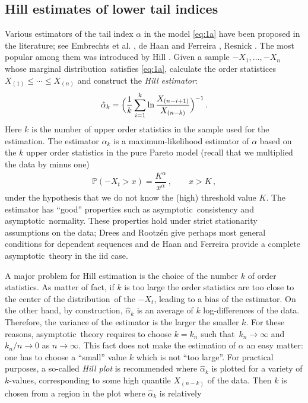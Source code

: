 \documentclass[11pt,a4]{amsart}
\newcommand{\asy}{asymptotic}
\newcommand{\beao}{\begin{eqnarray*}}
\newcommand{\eeao}{\end{eqnarray*}\noindent}
\newcommand{\beam}{\begin{eqnarray}}
\newcommand{\eeam}{\end{eqnarray}\noindent}
\newcommand{\nto}{n\to\infty}
\newcommand{\st}{such that}
\newcommand{\ds}{distribution}
\newcommand{\seq}{sequence}
\renewcommand{\P }{{\mathbb P}}
\newcommand{\1}{{\mathbf 1}}
\begin{document}
\subsection{Hill estimates of lower tail indices}\label{sec:Hill}
Various estimators of the tail index $\alpha$  in the model
\eqref{eq:1a} have been proposed in the literature;
see Embrechts et al. \cite{embrechts:klueppelberg:mikosch:1997}, de
Haan and Ferreira \cite{haan:ferreira:2006}, Resnick
\cite{resnick:2007}. The most popular among them was introduced  by
Hill \cite{hill1975simple}.
Given a sample $-X_1,\ldots,-X_n$ whose marginal \ds\ satisfies  \eqref{eq:1a}, calculate
the order statistices $X_{(1)}\le \cdots\le X_{(n)}$  and construct the
{\em Hill estimator}:
\beao%
  \hat \alpha_k = \Big(
    {1 \over k} \sum_{i=1}^k \ln {X_{(n-i+1)} \over X_{(n-k)}}
    \Big)^{-1}\,.
\eeao
Here $k$  is the number of upper order statistics in the sample used
for the estimation. The estimator $\hat \alpha_k$ is 
a maximum-likelihood estimator of $\alpha$ based on the $k$ upper
order statistics in the pure Pareto model (recall that 
we multiplied the data by minus one)
\beam\label{eq:3}
\P(-X_t>x)= \dfrac{K^\alpha}{x^\alpha}\,,\qquad x>K\,,
\eeam
under the hypothesis that we do not know the (high) threshold value
$K$. The estimator has ``good'' properties such as 
\asy\ consistency and \asy\ normality. These properties hold under
strict stationarity assumptions on the data; Drees and Rootz\'en 
\cite{drees:rootzen:2010} give perhaps most general conditions for
dependent \seq s and de Haan and Ferreira \cite{haan:ferreira:2006} provide
a complete \asy\ theory in the iid case.
\par
A major problem for Hill estimation is the choice of the number $k$ of
order statistics. As  matter of fact,
if $k$ is too large the order statistics are too close to the center
of the \ds\ of the $-X_t$, leading to a bias
of the estimator. On the other hand, by construction, $\hat \alpha_k$ is an average of $k$ log-differences of the 
data. Therefore, the variance of the estimator is the larger the
smaller $k$. For these reasons, \asy\ theory requires 
to choose $k=k_n$ \st\ $k_n\to\infty$ and $k_n/n\to 0$ as $\nto$. This
fact does not make the estimation of $\alpha$ an  
easy matter: one has to choose a ``small'' value $k$ which is not
``too large''. For practical purposes,
a so-called {\em Hill plot} is recommended where $\hat \alpha_k$ is
plotted for a variety of $k$-values, corresponding to
some high  quantile $X_{(n-k)}$ of the data. Then $k$ is chosen from a
region in the plot where $\hat \alpha_k$ is relatively
\end{document}
